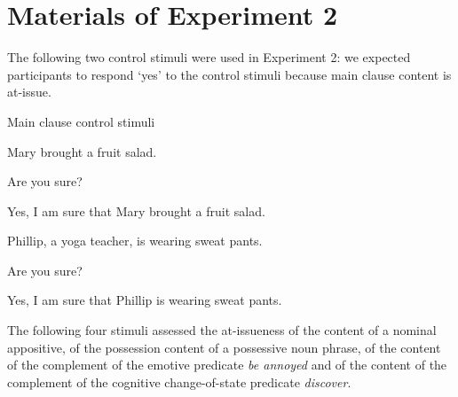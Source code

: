 \documentclass[11pt,fleqn]{article}
\newcommand{\6}{\mbox{$[\hspace*{-.6mm}[$}}
\newcommand{\9}{\mbox{$]\hspace*{-.6mm}]$}}
\begin{document}
\section{Materials of Experiment 2}\label{a-Exp2}

The following two control stimuli were used in Experiment 2: we expected participants to respond `yes' to the control stimuli because main clause content is at-issue.

\begin{exe}
\ex\label{control} Main clause control stimuli
\begin{xlist}
\ex
\begin{xlist}
 Mary brought a fruit salad.

 Are you sure?

 Yes, I am sure that Mary brought a fruit salad.
\end{xlist}
\ex 
\begin{xlist}
 Phillip, a yoga teacher, is wearing sweat pants.

 Are you sure?

 Yes, I am sure that Phillip is wearing sweat pants.
\end{xlist}
\end{xlist}
\end{exe}

The following four stimuli assessed the at-issueness of the content of a nominal appositive, of the possession content of a possessive noun phrase, of the content of the complement of the emotive predicate {\em be annoyed} and of the content of the complement of the cognitive change-of-state predicate {\em discover}. 
\end{document}
